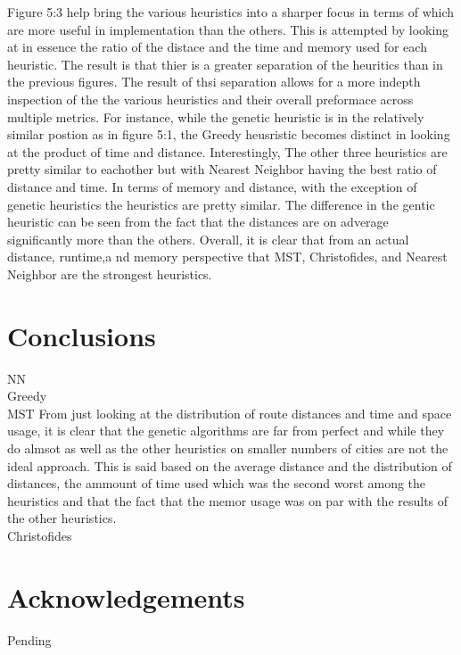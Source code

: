 \documentclass[midd]{thesis}
\newcommand{\tab}{\hspace*{2em}}
\begin{document}
\tab Figure 5:3 help bring the various heuristics into a sharper focus in terms of which are more useful in implementation than the others. This is attempted by looking at in essence the ratio of the distace and the time and memory used for each heuristic. The result is that thier is a greater separation of the heuritics than in the previous figures. The result of thsi separation allows for a more indepth inspection of the the various heuristics and their overall preformace across multiple metrics. For instance, while the genetic heuristic is in the relatively similar postion as in figure 5:1, the Greedy heusristic becomes distinct in looking at the product of time and distance. Interestingly, The other three heuristics are pretty similar to eachother but with Nearest Neighbor having the best ratio of distance and time. In terms of memory and distance, with the exception of genetic heuristics the heuristics are pretty similar. The difference in the gentic heuristic can be seen from the fact that the distances are on adverage significantly more than the others. Overall, it is clear that from an actual distance, runtime,a nd memory perspective that MST, Christofides, and Nearest Neighbor are the strongest heuristics.
\chapter{Conclusions}
\tab NN\\
\tab Greedy \\
\tab MST
\tab From just looking at the distribution of route distances and time and space usage, it is clear that the genetic algorithms are far from perfect and while they do almsot as well as the other heuristics on smaller numbers of cities are not the ideal approach. This is said based on the average distance and the distribution of distances, the ammount of time used which was the second worst among the heuristics and that the fact that the memor usage was on par with the results of the other heuristics.\\
\tab Christofides
\chapter{Acknowledgements}
Pending

\end{document}
